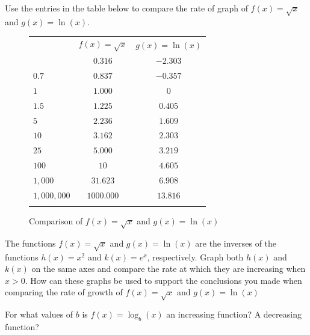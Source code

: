 \documentclass[10pt,]{book}
\theoremstyle{ptxdefinitionnotitle}
\theoremstyle{ptxdefinitiontitle}
\theoremstyle{ptxdefinitionnotitle}
\theoremstyle{ptxdefinitiontitle}
\theoremstyle{ptxdefinitionnotitle}
\theoremstyle{ptxdefinitiontitle}
\numberwithin{equation}{section}
\newcommand{\hrulemedium}{\noalign{\hrule height 0.07em}}
\newcommand{\hrulethick} {\noalign{\hrule height 0.11em}}
\newcommand{\gt}{>}
\begin{document}
\begin{divisionexercise}{5}\hypertarget{exercise-95}{}
\hypertarget{p-361}{}%
Use the entries in the table below to compare the rate of graph of \(f(x) = \sqrt{x}\) and \(g(x) = \ln(x)\). \begin{figure}
\centering
\begin{tabular}{ccc}\hrulethick
\multicolumn{1}{l}{\(x\)}&\(f(x) = \sqrt{x}\)&\(g(x) = \ln(x)\)\tabularnewline\hrulemedium
\multicolumn{1}{l}{\(0.1\)}&\(0.316\)&\(-2.303\)\tabularnewline[0pt]
\multicolumn{1}{l}{\(0.7\)}&\(0.837\)&\(-0.357\)\tabularnewline[0pt]
\multicolumn{1}{l}{\(1\)}&\(1.000\)&\(0\)\tabularnewline[0pt]
\multicolumn{1}{l}{\(1.5\)}&\(1.225\)&\(0.405\)\tabularnewline[0pt]
\multicolumn{1}{l}{\(5\)}&\(2.236\)&\(1.609\)\tabularnewline[0pt]
\multicolumn{1}{l}{\(10\)}&\(3.162\)&\(2.303\)\tabularnewline[0pt]
\multicolumn{1}{l}{\(25\)}&\(5.000\)&\(3.219\)\tabularnewline[0pt]
\multicolumn{1}{l}{\(100\)}&\(10\)&\(4.605\)\tabularnewline[0pt]
\multicolumn{1}{l}{\(1,000\)}&\(31.623\)&\(6.908\)\tabularnewline[0pt]
\multicolumn{1}{l}{\(1,000,000\)}&\(1000.000\)&\(13.816\)\tabularnewline\hrulethick
\end{tabular}
\caption{Comparison of \(f(x) = \sqrt{x}\) and \(g(x) = \ln(x)\)\label{figure-31}}
\end{figure}
 The functions \(f(x) = \sqrt{x}\) and \(g(x) = \ln(x)\) are the inverses of the functions \(h(x) = x^2\) and \(k(x) = e^x\), respectively. Graph both \(h(x)\) and \(k(x)\) on the same axes and compare the rate at which they are increasing when \(x \gt 0\). How can these graphs be used to support the conclusions you made when comparing the rate of growth of \(f(x) = \sqrt{x}\) and \(g(x) = \ln(x)\)%
\end{divisionexercise}%
\begin{divisionexercise}{6}\hypertarget{exercise-96}{}
\hypertarget{p-362}{}%
For what values of \(b\) is \(f(x) = \log_b \left( x \right )\) an increasing function? A decreasing function?%
\end{divisionexercise}%
\end{document}
